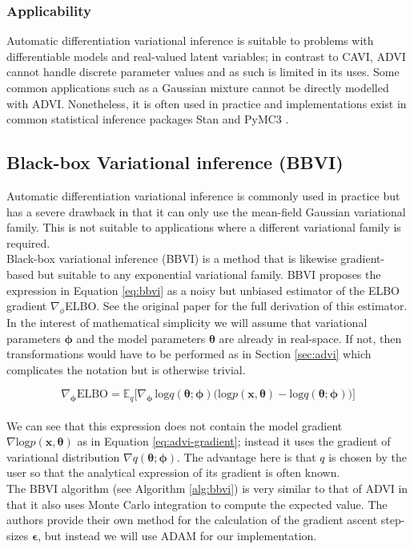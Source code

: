 \subsubsection{Applicability}
Automatic differentiation variational inference is suitable to problems with differentiable models and real-valued latent variables; in contrast to CAVI, ADVI cannot handle discrete parameter values and as such is limited in its uses. Some common applications such as a Gaussian mixture cannot be directly modelled with ADVI. Nonetheless, it is often used in practice and implementations exist in common statistical inference packages Stan \parencite{Stan} and PyMC3 \parencite{pymc3}.


\subsection{Black-box Variational inference (BBVI)} \label{sec:bbvi}

Automatic differentiation variational inference is commonly used in practice but has a severe drawback in that it can only use the mean-field Gaussian variational family. This is not suitable to applications where a different variational family is required.
\\
Black-box variational inference (BBVI) is a method that is likewise gradient-based but suitable to any exponential variational family. BBVI proposes the expression in Equation \ref{eq:bbvi} as a noisy but unbiased estimator of the ELBO gradient $\nabla_\phi$ELBO. See the original paper \parencite{BBVI} for the full derivation of this estimator. 
\\
In the interest of mathematical simplicity we will assume that variational parameters $\bm\phi$ and the model parameters $\bm\theta$ are already in real-space. If not, then transformations would have to be performed as in Section \ref{sec:advi} which complicates the notation but is otherwise trivial.

\begin{equation}
    \label{eq:bbvi}
    \nabla_{\bm{\phi}}\mathrm{ELBO} = \mathbb{E}_q \Big[ \nabla_{\bm{\phi}} \, \mathrm{log}q(\bm\theta; \bm\phi) \big( \mathrm{log}p(\bm{x}, \bm\theta) - \mathrm{log}q(\bm\theta; \bm\phi) \big) \Big]
\end{equation}
\\ 
We can see that this expression does not contain the model gradient $\nabla \mathrm{log}p(\bm{x}, \bm\theta)$ as in Equation \ref{eq:advi-gradient}; instead it uses the gradient of variational distribution $\nabla q(\bm\theta; \bm\phi)$. The advantage here is that $q$ is chosen by the user so that the analytical expression of its gradient is often known.
\\
The BBVI algorithm (see Algorithm \ref{alg:bbvi}) is very similar to that of ADVI in that it also uses Monte Carlo integration to compute the expected value. 
The authors provide their own method for the calculation of the gradient ascent step-sizes $\bm\epsilon$, but instead we will use ADAM \parencite{ADAM} for our implementation.

